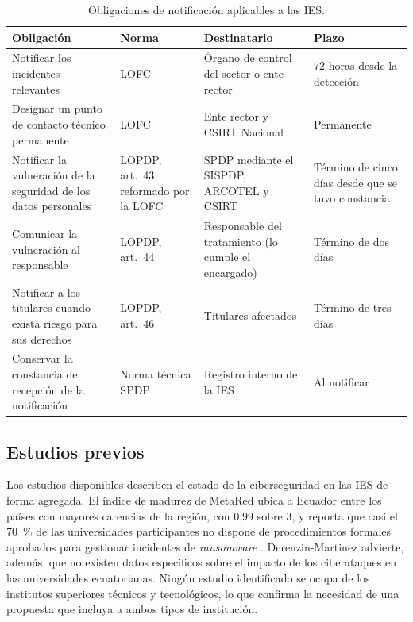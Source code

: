 \begin{table}[htbp]
  \centering
  \caption{Obligaciones de notificación aplicables a las IES.}
  \label{tab:requisitos_normativos}
  \small
  \begin{tabular}{|L{\tabcolsep}|L{\tabcolsep}|L{\tabcolsep}|L{\tabcolsep}|}
    \hline
    \textbf{Obligación} & \textbf{Norma} & \textbf{Destinatario} & \textbf{Plazo} \\
    \hline
    Notificar los incidentes relevantes & LOFC  & Órgano de control del sector o ente rector & 72 horas desde la detección \\
    \hline
    Designar un punto de contacto técnico permanente & LOFC  & Ente rector y CSIRT Nacional & Permanente \\
    \hline
    Notificar la vulneración de la seguridad de los datos personales & LOPDP, art.~43, reformado por la LOFC & SPDP mediante el SISPDP, ARCOTEL y CSIRT & Término de cinco días desde que se tuvo constancia \\
    \hline
    Comunicar la vulneración al responsable & LOPDP, art.~44 & Responsable del tratamiento (lo cumple el encargado) & Término de dos días \\
    \hline
    Notificar a los titulares cuando exista riesgo para sus derechos & LOPDP, art.~46 & Titulares afectados & Término de tres días \\
    \hline
    Conservar la constancia de recepción de la notificación & Norma técnica SPDP & Registro interno de la IES & Al notificar \\
    \hline
  \end{tabular}
  \par\normalsize\raggedright
\end{table}

\subsection{Estudios previos}
Los estudios disponibles describen el estado de la ciberseguridad en las IES de forma agregada. El índice de madurez de MetaRed ubica a Ecuador entre los países con mayores carencias de la región, con 0,99 sobre 3, y reporta que casi el 70~\% de las universidades participantes no dispone de procedimientos formales aprobados para gestionar incidentes de \textit{ransomware} \cite{metared2025imc}. Derenzin-Martinez \cite{derenzin2024} advierte, además, que no existen datos específicos sobre el impacto de los ciberataques en las universidades ecuatorianas. Ningún estudio identificado se ocupa de los institutos superiores técnicos y tecnológicos, lo que confirma la necesidad de una propuesta que incluya a ambos tipos de institución. 

